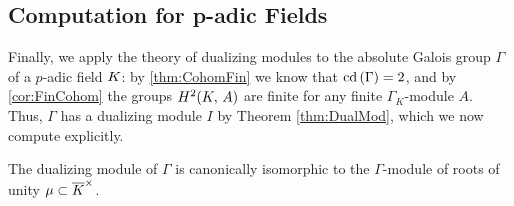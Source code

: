 \documentclass[a4paper, oneside]{memoir}
\begin{document}
\subsection{Computation for p-adic Fields}

Finally, we apply the theory of dualizing modules to the absolute Galois group \(\Gamma\) of a \(p\)-adic field \(K\): by \ref{thm:CohomFin} we know that \(\operatorname{cd}{(\Gamma)}=2\), and by \ref{cor:FinCohom} the groups \(H^{2}( K, \, A )\) are finite for any finite \(\Gamma_K\)-module $A$. Thus, \(\Gamma\) has a dualizing module \(I\) by Theorem \ref{thm:DualMod}, which we now compute explicitly.

\begin{proposition}
	The dualizing module of \(\Gamma\) is canonically isomorphic to the \(\Gamma\)-module of roots of unity \(\mu\subset\overline{K}^\times\).
\end{proposition}
\end{document}
